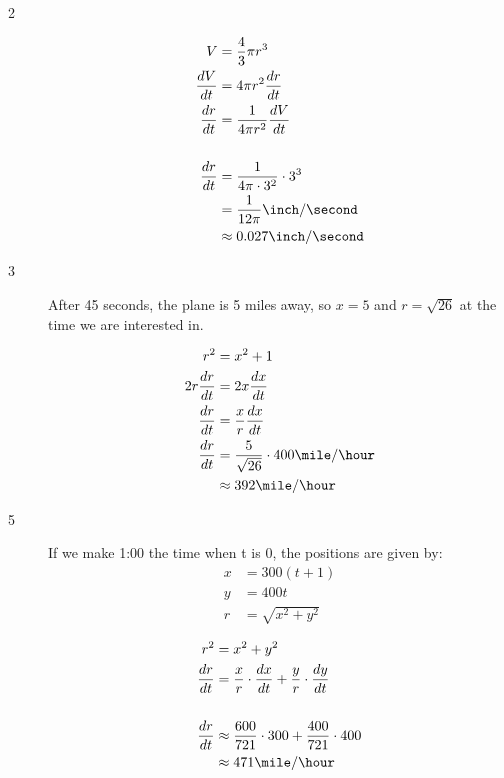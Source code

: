 \documentclass[fleqn]{exam}
\begin{document}
\begin{description}
\item[2]
\begin{align*}
  V &= \frac{4}{3} \pi r^3  \\
  \frac{dV}{dt} &= 4 \pi r^2 \frac{dr}{dt}  \\
  \frac{dr}{dt} &= \frac{1}{4 \pi r^2} \frac{dV}{dt} \\
  \\
  \frac{dr}{dt} &= \frac{1}{4 \pi \cdot 3^2} \cdot 3^3 \\
                &= \frac{1}{12 \pi} \inch / \second \\
                &\approx 0.027 \inch / \second \\
\end{align*}

\item[3]
After 45 seconds, the plane is 5 miles away, so $x= 5$ and $r = \sqrt{26}$ at the time we are interested in.
 
\begin{align*}
  r^2 &= x^2 + 1  \\
  2 r \frac{dr}{dt} &= 2x \frac{dx}{dt} \\
  \frac{dr}{dt} &= \frac{x}{r} \frac{dx}{dt}
  \\
  \frac{dr}{dt} &= \frac{5}{\sqrt{26}} \cdot 400 \mile / \hour \\
                &\approx  392 \mile / \hour \\
\end{align*}

\pagebreak

\item[5]
If we make 1:00 the time when t is 0, the positions are given by:
\begin{align*}
  x &= 300(t + 1) \\
  y &= 400 t \\
  r &= \sqrt{x^2 + y^2} \\
\end{align*}
\begin{align*}
  r^2 &= x^2 + y^2 \\
  \frac{dr}{dt} &= \frac{x}{r} \cdot \frac{dx}{dt} + \frac{y}{r} \cdot \frac{dy}{dt} \\
  \\
  \frac{dr}{dt} &\approx \frac{600}{721} \cdot 300 + \frac{400}{721} \cdot 400  \\
  &\approx 471 \mile / \hour \\
\end{align*}


\end{description}
\end{document}
